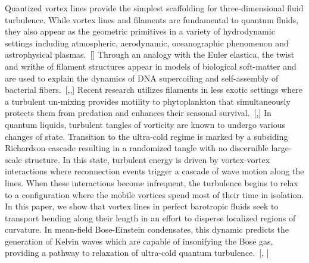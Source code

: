 \documentclass[aps,graphicx,reprint,onecolumn,12pt,tightenlines,longbibliography]{revtex4-1}
\newcommand{\sas}[2]{{#2}}
\begin{document}
Quantized vortex lines provide the simplest scaffolding for three-dimensional fluid turbulence. While vortex lines and filaments are fundamental to quantum fluids, they also appear as the geometric primitives in a variety of hydrodynamic settings including atmospheric,  aerodynamic, oceanographic \sas{hydrodynamic}{} phenomenon and astrophysical plasmas.~[] Through an analogy with the Euler elastica, the twist and writhe of filament structures  appear in models of biological soft-matter and are used to explain the dynamics of DNA supercoiling and self-assembly of bacterial fibers.~[,,] Recent research utilizes filaments in less exotic settings where a turbulent un-mixing provides motility to phytoplankton that simultaneously protects them from predation and enhances their seasonal survival.~[,] In quantum liquids, turbulent tangles of vorticity are known to undergo various changes of state. Transition to the ultra-cold regime is marked by a subsiding Richardson cascade resulting in a randomized tangle with no discernible large-scale structure. In this state, turbulent energy is driven by vortex-vortex interactions where reconnection events trigger a cascade of wave motion along the lines. When these interactions become infrequent, the turbulence begins to relax to a configuration where the mobile vortices spend most of their time in isolation. In this paper, we show that vortex lines in perfect barotropic fluids seek to transport bending along their length in an effort to disperse localized regions of curvature. In mean-field Bose-Einstein condensates, this dynamic predicts the generation of Kelvin waves which are capable of insonifying the Bose gas, providing a pathway to relaxation of ultra-cold quantum turbulence.~[,  ] 
\end{document}
